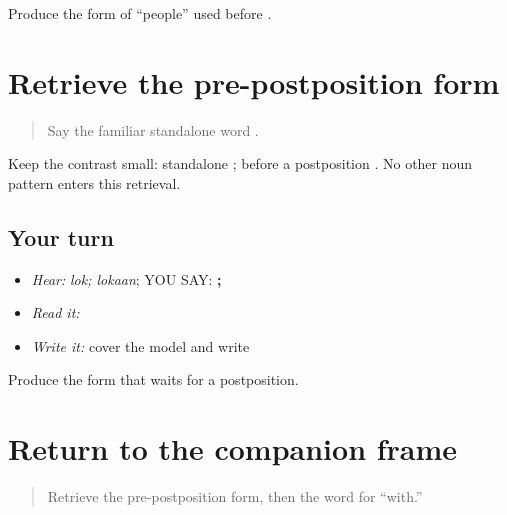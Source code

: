 \begin{tcolorbox}[breakable,colback=teal!4,colframe=teal!35!black,title={Before you move on}]
Produce the form of “people” used before \textbf{}.
\end{tcolorbox}
\section[\texorpdfstring{\pa{ਲੋਕਾਂ} (lokaan)}{ਲੋਕਾਂ (lokaan)}]{Retrieve the pre-postposition form}

\label{lesson:PA-C192-lokaan-review}



\begin{quote}
Say the familiar standalone word \textbf{}.
\end{quote}

\begin{grammarlens}[title={Grammar Lens}]
Keep the contrast small: standalone \textbf{}; before a postposition \textbf{}. No other noun pattern enters this retrieval.
\end{grammarlens}

\subsection*{Your turn}
\begin{itemize}
\raggedright
  \item \emph{Hear:} \emph{lok; lokaan}; YOU SAY: \textbf{; }
  \item \emph{Read it:} \textbf{}
  \item \emph{Write it:} cover the model and write \textbf{}
\end{itemize}

\begin{tcolorbox}[breakable,colback=teal!4,colframe=teal!35!black,title={Before you move on}]
Produce the form that waits for a postposition.
\end{tcolorbox}
\section[\texorpdfstring{\pa{ਲੋਕਾਂ} \pa{ਨਾਲ} (lokaan naal)}{ਲੋਕਾਂ ਨਾਲ (lokaan naal)}]{Return to the companion frame}

\label{lesson:PA-C192-lokaan-naal}



\begin{quote}
Retrieve the pre-postposition form, then the word for “with.”
\end{quote}

